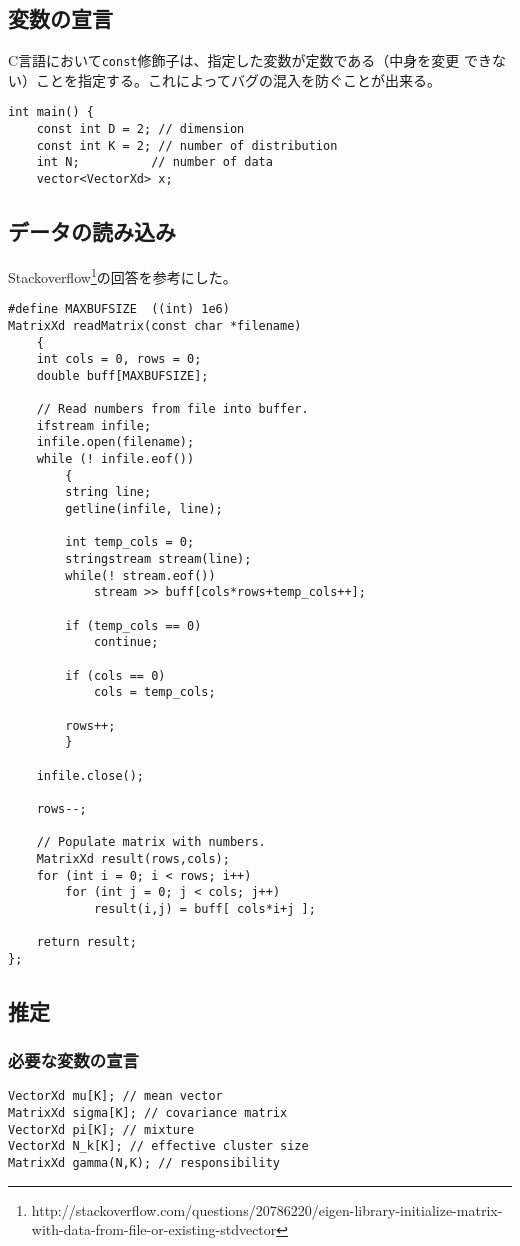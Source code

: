 \documentclass[a4paper,10.5pt]{jsarticle}  %
\begin{document}
\subsection{変数の宣言}
C言語において\texttt{const}修飾子は、指定した変数が定数である（中身を変更 できない）ことを指定する。これによってバグの混入を防ぐことが出来る。
\begin{lstlisting}
int main() {
    const int D = 2; // dimension
    const int K = 2; // number of distribution
    int N;          // number of data
    vector<VectorXd> x;
\end{lstlisting}

\subsection{データの読み込み}
Stackoverflow\footnote{http://stackoverflow.com/questions/20786220/eigen-library-initialize-matrix-with-data-from-file-or-existing-stdvector}の回答を参考にした。

\begin{lstlisting}
#define MAXBUFSIZE  ((int) 1e6)
MatrixXd readMatrix(const char *filename)
    {
    int cols = 0, rows = 0;
    double buff[MAXBUFSIZE];

    // Read numbers from file into buffer.
    ifstream infile;
    infile.open(filename);
    while (! infile.eof())
        {
        string line;
        getline(infile, line);

        int temp_cols = 0;
        stringstream stream(line);
        while(! stream.eof())
            stream >> buff[cols*rows+temp_cols++];

        if (temp_cols == 0)
            continue;

        if (cols == 0)
            cols = temp_cols;

        rows++;
        }

    infile.close();

    rows--;

    // Populate matrix with numbers.
    MatrixXd result(rows,cols);
    for (int i = 0; i < rows; i++)
        for (int j = 0; j < cols; j++)
            result(i,j) = buff[ cols*i+j ];

    return result;
};
\end{lstlisting}

\subsection{推定}

\subsubsection{必要な変数の宣言}
\begin{lstlisting}
VectorXd mu[K]; // mean vector
MatrixXd sigma[K]; // covariance matrix
VectorXd pi[K]; // mixture
VectorXd N_k[K]; // effective cluster size
MatrixXd gamma(N,K); // responsibility
\end{lstlisting}
\end{document}
